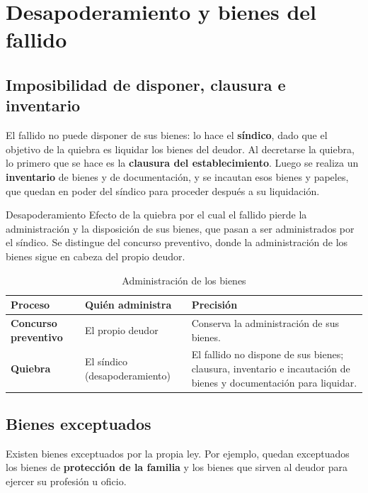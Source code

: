 \documentclass[12pt,oneside]{book}
\begin{document}
\section{Desapoderamiento y bienes del fallido}

\subsection{Imposibilidad de disponer, clausura e inventario}

El fallido no puede disponer de sus bienes: lo hace el \textbf{síndico}, dado que el objetivo de la quiebra es liquidar los bienes del deudor. Al decretarse la quiebra, lo primero que se hace es la \textbf{clausura del establecimiento}. Luego se realiza un \textbf{inventario} de bienes y de documentación, y se incautan esos bienes y papeles, que quedan en poder del síndico para proceder después a su liquidación.

\begin{definition}{Desapoderamiento}
Efecto de la quiebra por el cual el fallido pierde la administración y la disposición de sus bienes, que pasan a ser administrados por el síndico. Se distingue del concurso preventivo, donde la administración de los bienes sigue en cabeza del propio deudor.
\end{definition}

\begin{table}[H]
\centering
\small
\caption{Administración de los bienes}
\begin{tabularx}{\textwidth}{>{\raggedright\arraybackslash}p{} >{\raggedright\arraybackslash}p{} Y}
\toprule
\textbf{Proceso} & \textbf{Quién administra} & \textbf{Precisión} \\
\midrule
\textbf{Concurso preventivo} & El propio deudor & Conserva la administración de sus bienes. \\
\textbf{Quiebra} & El síndico (desapoderamiento) & El fallido no dispone de sus bienes; clausura, inventario e incautación de bienes y documentación para liquidar. \\
\bottomrule
\end{tabularx}
\end{table}

\subsection{Bienes exceptuados}

Existen bienes exceptuados por la propia ley. Por ejemplo, quedan exceptuados los bienes de \textbf{protección de la familia} y los bienes que sirven al deudor para ejercer su profesión u oficio.
\end{document}
